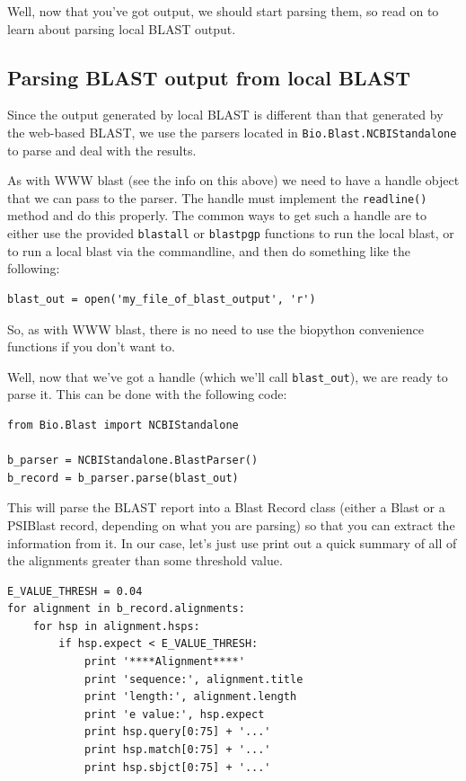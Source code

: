 \documentclass{report}
\begin{document}
Well, now that you've got output, we should start parsing them, so read on to learn about parsing local BLAST output.

\subsection{Parsing BLAST output from local BLAST}

Since the output generated by local BLAST is different than that generated by the web-based BLAST, we use the parsers located in \verb|Bio.Blast.NCBIStandalone| to parse and deal with the results.


As with WWW blast (see the info on this above) we need to have a handle object that we can pass to the parser. The handle must implement the \verb|readline()| method and do this properly. The common ways to get such a handle are to either use the provided \verb|blastall| or \verb|blastpgp| functions to run the local blast, or to run a local blast via the commandline, and then do something like the following:

\begin{verbatim}
blast_out = open('my_file_of_blast_output', 'r')
\end{verbatim}

So, as with WWW blast, there is no need to use the biopython convenience functions if you don't want to.


Well, now that we've got a handle (which we'll call \verb|blast_out|), we are ready to parse it. This can be done with the following code:

\begin{verbatim}
from Bio.Blast import NCBIStandalone

b_parser = NCBIStandalone.BlastParser()
b_record = b_parser.parse(blast_out)
\end{verbatim} 

This will parse the BLAST report into a Blast Record class (either a Blast or a PSIBlast record, depending on what you are parsing) so that you can extract the information from it. In our case, let's just use print out a quick summary of all of the alignments greater than some threshold value.

\begin{verbatim}
E_VALUE_THRESH = 0.04
for alignment in b_record.alignments:
    for hsp in alignment.hsps:
        if hsp.expect < E_VALUE_THRESH:
            print '****Alignment****'
            print 'sequence:', alignment.title
            print 'length:', alignment.length
            print 'e value:', hsp.expect
            print hsp.query[0:75] + '...'
            print hsp.match[0:75] + '...'
            print hsp.sbjct[0:75] + '...'
\end{verbatim}
\end{document}

